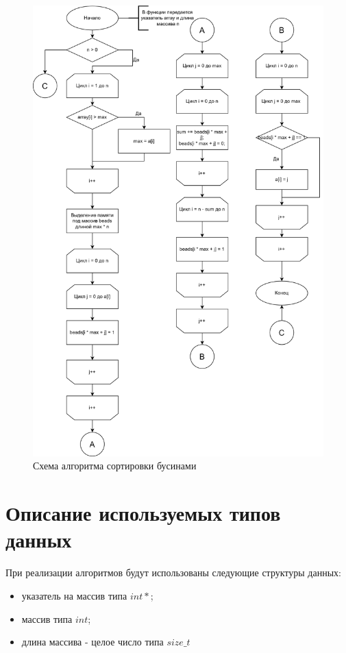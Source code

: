 \clearpage

\begin{figure}[h]
	\centering
	\includegraphics[height=0.8\textheight]{img/bead.png}
	\caption{Схема алгоритма сортировки бусинами}
	\label{fig:bead}
\end{figure}

\clearpage

\section{Описание используемых типов данных}

При реализации алгоритмов будут использованы следующие структуры данных:

\begin{itemize}
	\item указатель на массив типа $int *$;
	\item массив типа $int$;
	\item длина массива - целое число типа $size\_t$
\end{itemize}

